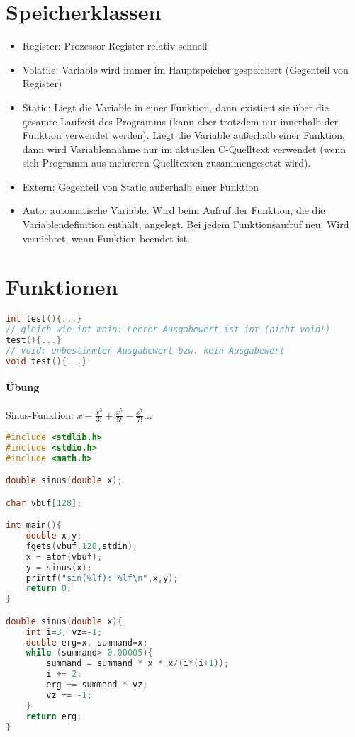 \section{Speicherklassen}
\begin{itemize}
\item Register: Prozessor-Register relativ schnell
\item Volatile: Variable wird immer im Hauptspeicher gespeichert (Gegenteil von Register)
\item Static: Liegt die Variable in einer Funktion, dann existiert sie über die gesamte Laufzeit des Programms (kann aber trotzdem nur innerhalb der Funktion verwendet werden). Liegt die Variable außerhalb einer Funktion, dann wird Variablennahme nur im aktuellen C-Quelltext verwendet (wenn sich Programm aus mehreren Quelltexten zusammengesetzt wird).
\item Extern: Gegenteil von Static außerhalb einer Funktion
\item Auto: automatische Variable. Wird beim Aufruf der Funktion, die die Variablendefinition enthält, angelegt. Bei jedem Funktionsaufruf neu. Wird vernichtet, wenn Funktion beendet ist.
\end{itemize}

\section{Funktionen}
\begin{lstlisting}[language=C]
int test(){...}
// gleich wie int main: Leerer Ausgabewert ist int (nicht void!)
test(){...}
// void: unbestimmter Ausgabewert bzw. kein Ausgabewert
void test(){...}
\end{lstlisting}

\paragraph{Übung} Sinus-Funktion: $x-\frac{x^3}{3!}+\frac{x^5}{5!}-\frac{x^7}{7!}...$
\begin{lstlisting}[language=C]
#include <stdlib.h>
#include <stdio.h>
#include <math.h>

double sinus(double x);

char vbuf[128];

int main(){
	double x,y;
	fgets(vbuf,128,stdin); 
	x = atof(vbuf);
	y = sinus(x);
	printf("sin(%lf): %lf\n",x,y);
	return 0;
}

double sinus(double x){
	int i=3, vz=-1;
	double erg=x, summand=x;
	while (summand> 0.00005){
		summand = summand * x * x/(i*(i+1));
		i += 2;
		erg += summand * vz;
		vz += -1;
	}
	return erg;
}

\end{lstlisting}

